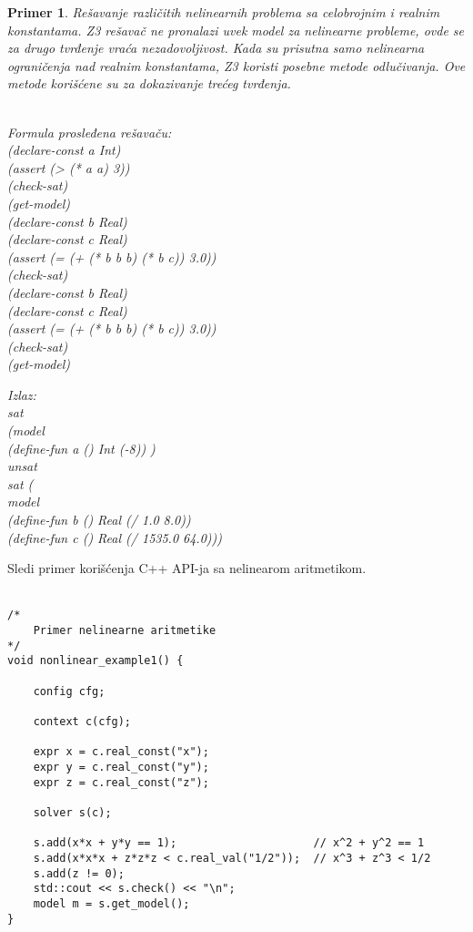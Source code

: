 \documentclass[12pt,oneside]{memoir}
\newtheorem{primer}{Primer}
\begin{document}
\begin{primer} Rešavanje različitih nelinearnih problema sa celobrojnim i realnim konstantama. Z3 rešavač ne pronalazi uvek model za nelinearne probleme, ovde se za drugo tvrđenje vraća nezadovoljivost. Kada su prisutna samo nelinearna ograničenja nad realnim konstantama, Z3 koristi posebne metode odlučivanja. Ove metode korišćene su za dokazivanje trećeg tvrđenja.\\ \\
\begin{minipage}[b]{0.4\textwidth}
Formula prosleđena rešavaču:
\\(declare-const a Int)
\\(assert (> (* a a) 3))
\\(check-sat)
\\(get-model)
\\(declare-const b Real)
\\(declare-const c Real)
\\(assert (= (+ (* b b b) (* b c)) 3.0))
\\(check-sat)
\\(declare-const b Real)
\\(declare-const c Real)
\\(assert (= (+ (* b b b) (* b c)) 3.0))
\\(check-sat)
\\(get-model)

\end{minipage}
\hspace{2.6cm}
\begin{minipage}[t]{0.4\textwidth}
\vspace{-9.75cm}
Izlaz:
\\sat 
\\(model 
\\(define-fun a () Int (-8)) ) 
\\unsat 
\\sat (
\\model 
\\(define-fun b () Real (/ 1.0 8.0)) 
\\(define-fun c () Real (/ 1535.0 64.0)))
\end{minipage}
\end{primer}
Sledi primer korišćenja C++ API-ja sa nelinearom aritmetikom. 
\\ \\
\begin{lstlisting}
/*
	Primer nelinearne aritmetike
*/
void nonlinear_example1() {

    config cfg;

    context c(cfg);

    expr x = c.real_const("x");
    expr y = c.real_const("y");
    expr z = c.real_const("z");
                     
    solver s(c);

    s.add(x*x + y*y == 1);                     // x^2 + y^2 == 1
    s.add(x*x*x + z*z*z < c.real_val("1/2"));  // x^3 + z^3 < 1/2
    s.add(z != 0);
    std::cout << s.check() << "\n";
    model m = s.get_model();
}

\end{lstlisting}
\end{document}
